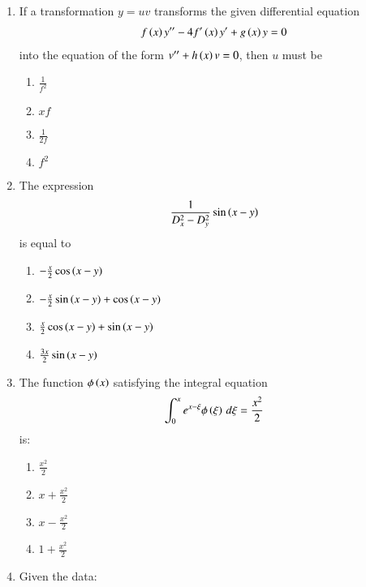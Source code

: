 \documentclass[journal]{IEEEtran}
\begin{document}
\begin{enumerate}
\item If a transformation $y = u v$ transforms the given differential equation 
\begin{align}
f \left(x\right) y^{\prime\prime} - 4 f^\prime \left(x\right) y^\prime + g \left(x\right) y = 0 
\end{align}
into the equation of the form $v^{\prime\prime} + h \left(x\right) v = 0$, then $u$ must be

\begin{enumerate}
    \item $\frac{1}{f^2}$
    \item $x f$
    \item $\frac{1}{2 f}$
    \item $f^2$
\end{enumerate}

\item The expression 
\begin{align}
\frac{1}{D_x^2 - D_y^2} \sin \left(x - y\right)
\end{align}
is equal to

\begin{enumerate}
    \item $-\frac{x}{2} \cos \left(x - y\right)$
    \item $-\frac{x}{2} \sin \left(x - y\right) + \cos \left(x - y\right)$
    \item $\frac{x}{2} \cos \left(x - y\right) + \sin \left(x - y\right)$
    \item $\frac{3x}{2} \sin \left(x - y\right)$
\end{enumerate}

\item The function $\phi \left(x\right)$ satisfying the integral equation
\begin{align}
\int_0^x e^{x-\xi} \phi \left(\xi\right) \, d\xi = \frac{x^2}{2}
\end{align}
is:

\begin{enumerate}
    \item $\frac{x^2}{2}$
    \item $x + \frac{x^2}{2}$
    \item $x - \frac{x^2}{2}$
    \item $1 + \frac{x^2}{2}$
\end{enumerate}

\item Given the data:

	\begin{table}[h!]
		\centering
		
	\end{table}


\end{enumerate}
\end{document}
